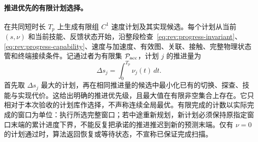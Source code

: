 \documentclass[11pt,a4paper]{article}
\numberwithin{equation}{section}
\theoremstyle{definition}
\begin{document}
\paragraph{推进优先的有限计划选择。}
在共同短时长 $T_p$ 上生成有限组 $C^1$ 速度计划及其实现候选。每个计划从当前 $(s,\nu)$ 和当前技能、反馈状态开始，沿整段检查~\eqref{eq:rev:progress-invariant}、\eqref{eq:rev:progress-capability}、速度与加速度、有效图、关联、接触、完整物理状态管和终端接续条件。记通过者为有限集 $\mathcal P_{\rm acc}$，计划 $j$ 的推进量为
\begin{equation}
 \Delta s_j=\int_0^{T_p}\nu_j(t)\,dt.
\end{equation}
首先取 $\Delta s_j$ 最大的计划，再在相同推进量的候选中最小化已有的切换、探查、技能与实现代价。这给出明确的推进优先级，且最大值在有限非空集合上存在。它只相对于本次验收的计划库作选择，不声称连续全局最优。有限完成的计数以实际完成的窗口为单位：执行所选完整窗口；若中途重新规划，新计划必须保持原指定窗口末端的累计进度下界，不能反复把承诺的推进推迟到新的预测末端。仅有 $\nu=0$ 的计划通过时，算法返回恢复或等待状态，不宣称已保证完成扫描。
\end{document}
